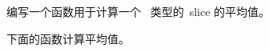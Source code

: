 \begin{Exercise}[title={平均值},difficulty=4]
\label{ex:average}
\Question\label{ex:average q1} 编写一个函数用于计算一个~ 类型的~slice 的平均值。
\end{Exercise}

\begin{Answer}
\Question 下面的函数计算平均值。

\showremarks
\end{Answer}
